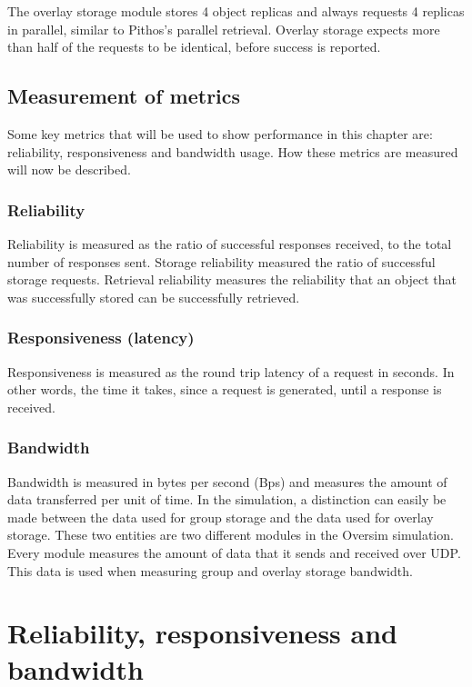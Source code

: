 The overlay storage module stores 4 object replicas and always requests 4 replicas in parallel, similar to Pithos's parallel retrieval. Overlay storage expects more than half of the requests to be identical, before success is reported.

\subsection{Measurement of metrics}
\label{metric_measurement}

Some key metrics that will be used to show performance in this chapter are: reliability, responsiveness and bandwidth usage. How these metrics are measured will now be described.

\subsubsection{Reliability}
Reliability is measured as the ratio of successful responses received, to the total number of responses sent. Storage reliability measured the ratio of successful storage requests. Retrieval reliability measures the reliability that an object that was successfully stored can be successfully retrieved.

\subsubsection{Responsiveness (latency)}

Responsiveness is measured as the round trip latency of a request in seconds.  In other words, the time it takes, since a request is generated, until a response is received.

\subsubsection{Bandwidth}

Bandwidth is measured in bytes per second (Bps) and measures the amount of data transferred per unit of time. In the simulation, a distinction can easily be made between the data used for group storage and the data used for overlay storage. These two entities are two different modules in the Oversim simulation. Every module measures the amount of data that it sends and received over UDP. This data is used when measuring group and overlay storage bandwidth.

\section{Reliability, responsiveness and bandwidth}

